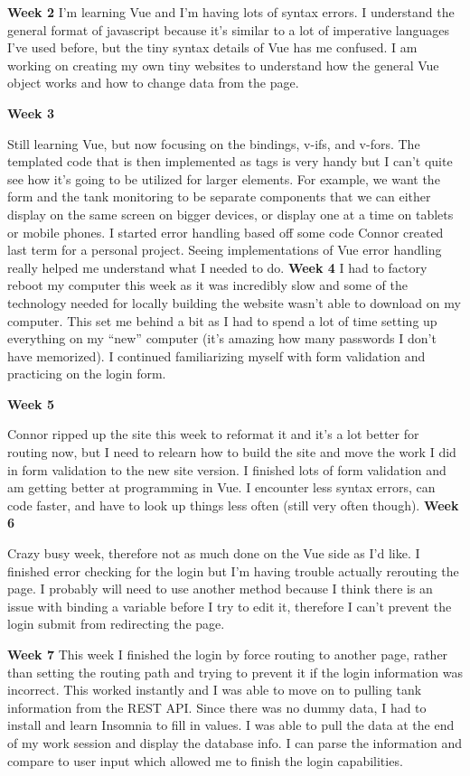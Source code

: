 \noindent\medskip\textbf{Week 2}
I’m learning Vue and I’m having lots of syntax errors.
I understand the general format of javascript because it’s similar to a lot of imperative languages I’ve used before, but the tiny syntax details of Vue has me confused.
I am working on creating my own tiny websites to understand how the general Vue object works and how to change data from the page.

\noindent\medskip\textbf{Week 3}

Still learning Vue, but now focusing on the bindings, v-ifs, and v-fors.
The templated code that is then implemented as tags is very handy but I can’t quite see how it’s going to be utilized for larger elements.
For example, we want the form and the tank monitoring to be separate components that we can either display on the same screen on bigger devices, or display one at a time on tablets or mobile phones.
I started error handling based off some code Connor created last term for a personal project.
Seeing implementations of Vue error handling really helped me understand what I needed to do.
\noindent\medskip\textbf{Week 4}
I had to factory reboot my computer this week as it was incredibly slow and some of the technology needed for locally building the website wasn’t able to download on my computer.
This set me behind a bit as I had to spend a lot of time setting up everything on my “new” computer (it’s amazing how many passwords I don’t have memorized).
I continued familiarizing myself with form validation and practicing on the login form.

\noindent\medskip\textbf{Week 5}

Connor ripped up the site this week to reformat it and it’s a lot better for routing now, but I need to relearn how to build the site and move the work I did in form validation to the new site version.
I finished lots of form validation and am getting better at programming in Vue.
I encounter less syntax errors, can code faster, and have to look up things less often (still very often though).
\noindent\medskip\textbf{Week 6}

Crazy busy week, therefore not as much done on the Vue side as I’d like.
I finished error checking for the login but I’m having trouble actually rerouting the page.
I probably will need to use another method because I think there is an issue with binding a variable before I try to edit it, therefore I can’t prevent the login submit from redirecting the page.

\noindent\medskip\textbf{Week 7}
This week I finished the login by force routing to another page, rather than setting the routing path and trying to prevent it if the login information was incorrect.
This worked instantly and I was able to move on to pulling tank information from the REST API.
Since there was no dummy data, I had to install and learn Insomnia to fill in values.
I was able to pull the data at the end of my work session and display the database info.
I can parse the information and compare to user input which allowed me to finish the login capabilities.

